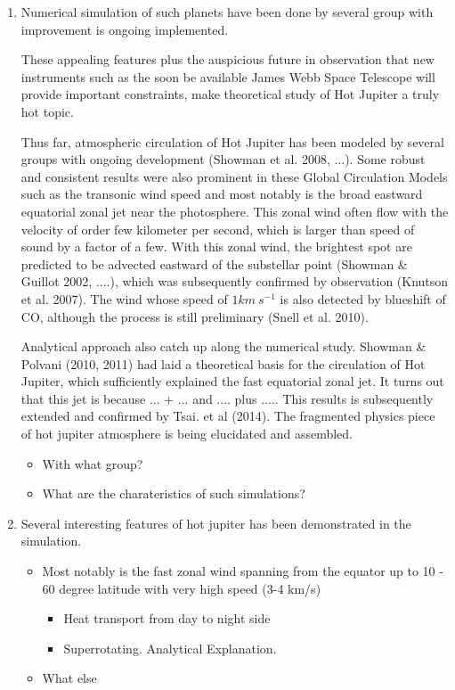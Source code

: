 \documentclass[11pt]{article}
\begin{document}
\begin{enumerate}
\item Numerical simulation of such planets have been done by several group with improvement is ongoing implemented.

These appealing features plus the auspicious future in observation that new instruments such as the soon be available James Webb Space Telescope will provide important constraints, make theoretical study of Hot Jupiter a truly hot topic. 

Thus far, atmospheric circulation of Hot Jupiter has been modeled by several groups with ongoing development (Showman et al. 2008, ...). Some robust and consistent results were also prominent in these Global Circulation Models such as the transonic wind speed and most notably is the broad eastward equatorial zonal jet near the photosphere. This zonal wind often flow with the velocity of order few kilometer per second, which is larger than speed of sound by a factor of a few. With this zonal wind, the brightest spot are predicted to be advected eastward of the substellar point (Showman \& Guillot 2002, ....), which was subsequently confirmed by observation (Knutson et al. 2007). The wind whose speed of $1km \ s^{-1}$ is also detected by blueshift of CO, although the process is still preliminary (Snell et al. 2010). 

Analytical approach also catch up along the numerical study. Showman \& Polvani (2010, 2011) had laid a theoretical basis for the circulation of Hot Jupiter, which sufficiently explained the fast equatorial zonal jet. It turns out that this jet is because ... + ... and .... plus ..... This results is subsequently extended and confirmed by Tsai. et al (2014). The fragmented physics piece of hot jupiter atmosphere is being elucidated and assembled.

\begin{itemize}
\item With what group?
\item What are the charateristics of such simulations?
\end{itemize}

\item Several interesting features of hot jupiter has been demonstrated in the simulation. 
\begin{itemize}
\item Most notably is the fast zonal wind spanning from the equator up to 10 - 60 degree latitude with very high speed (3-4 km/s) 
\begin{itemize} 
\item Heat transport from day to night side
\item Superrotating. Analytical Explanation. 
\end{itemize}
\item What else
\end{itemize}


\end{enumerate}
\end{document}
